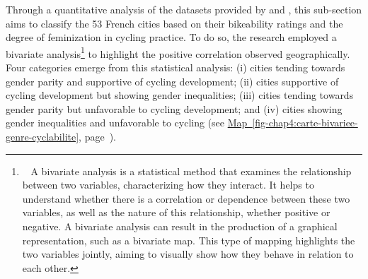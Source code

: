 \begin{refsegment}
Through a quantitative analysis of the datasets provided by \textcolor{blue}{\textcite{fub_barometre_2021}} and \textcolor{blue}{\textcite{insee_documentation_2023}}, this sub-section aims to classify the 53 French cities based on their bikeability ratings and the degree of feminization in cycling practice. To do so, the research employed a bivariate analysis\footnote{~
    A bivariate analysis is a statistical method that examines the relationship between two variables, characterizing how they interact. It helps to understand whether there is a correlation or dependence between these two variables, as well as the nature of this relationship, whether positive or negative. A bivariate analysis can result in the production of a graphical representation, such as a bivariate map. This type of mapping highlights the two variables jointly, aiming to visually show how they behave in relation to each other.
} to highlight the positive correlation observed geographically. Four categories emerge from this statistical analysis: (i) cities tending towards gender parity and supportive of cycling development; (ii) cities supportive of cycling development but showing gender inequalities; (iii) cities tending towards gender parity but unfavorable to cycling development; and (iv) cities showing gender inequalities and unfavorable to cycling (see \hyperref[fig-chap4:carte-bivariee-genre-cyclabilite]{Map~\ref{fig-chap4:carte-bivariee-genre-cyclabilite}}, page~\pageref{fig-chap4:carte-bivariee-genre-cyclabilite}).%


\end{refsegment}
